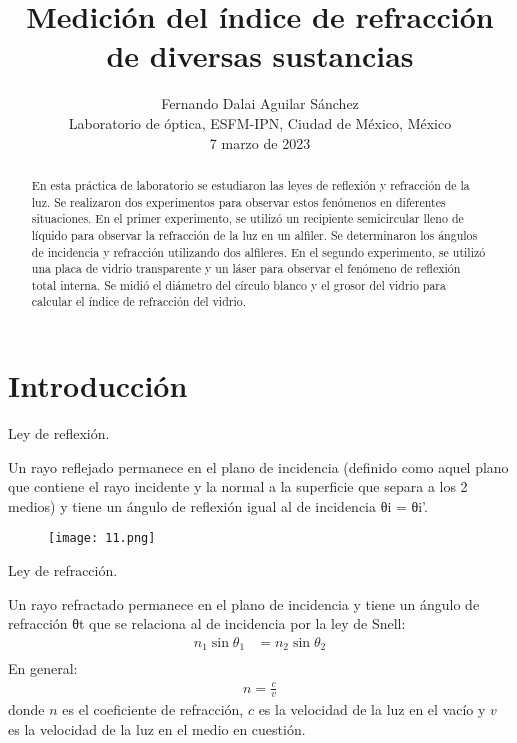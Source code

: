 \documentclass[10pt,journal]{IEEEtran}
\begin{document}
\title{Medición del índice de refracción de diversas sustancias}

\author{Fernando Dalai Aguilar Sánchez \\ Laboratorio de óptica, ESFM-IPN, Ciudad de México, México \\7 marzo de 2023}


\maketitle{}  

\begin{abstract}
En esta práctica de laboratorio se estudiaron las leyes de reflexión y refracción de la luz. Se realizaron dos experimentos para observar estos fenómenos en diferentes situaciones. En el primer experimento, se utilizó un recipiente semicircular lleno de líquido para observar la refracción de la luz en un alfiler. Se determinaron los ángulos de incidencia y refracción utilizando dos alfileres. En el segundo experimento, se utilizó una placa de vidrio transparente y un láser para observar el fenómeno de reflexión total interna. Se midió el diámetro del círculo blanco y el grosor del vidrio para calcular el índice de refracción del vidrio. 
\end{abstract}  

\section{Introducción}
Ley de reflexión.

Un rayo reflejado permanece en el plano de incidencia (definido como aquel plano que contiene el rayo incidente y la normal a la superficie que separa a los 2 medios) y tiene un ángulo de reflexión igual al de incidencia θi = θi’.

\begin{figure}[!ht]
\begin {center}
\texttt{[image: 11.png]}
\caption{}
\end {center}
\end{figure}

Ley de refracción.

Un rayo refractado permanece en el plano de incidencia y tiene un ángulo
de refracción θt que se relaciona al de incidencia por la ley de Snell:
\begin{align*}
    n_1\sin\theta_1 &= n_2\sin\theta_2 \\
\end{align*} En general: 
\begin{align*}
    n = \frac{c}{v}
\end{align*}
donde $n$ es el coeficiente de refracción, $c$ es la velocidad de la luz en el vacío y $v$ es la velocidad de la luz en el medio en cuestión.
\end{document}
